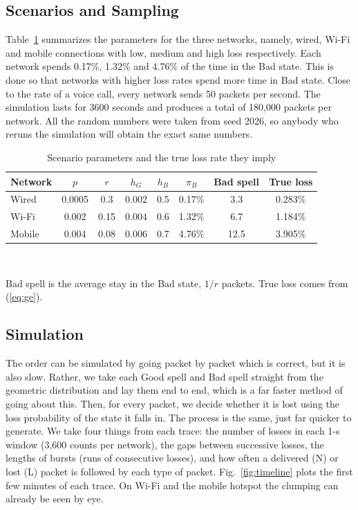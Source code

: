 \documentclass[conference]{IEEEtran}
\begin{document}
\subsection{Scenarios and Sampling}
Table~\ref{tab:params} summarizes the parameters for the three networks, namely, wired, Wi-Fi and mobile connections with low, medium and high loss respectively. Each network spends 0.17\%, 1.32\% and 4.76\% of the time in the Bad state. This is done so that networks with higher loss rates spend more time in Bad state. Close to the rate of a voice call, every network sends 50 packets per second. The simulation lasts for 3600 seconds and produces a total of 180,000 packets per network. All the random numbers were taken from seed 2026, so anybody who reruns the simulation will obtain the exact same numbers.

\begin{table}[!t]
\caption{Scenario parameters and the true loss rate they imply}
\label{tab:params}
\centering
\footnotesize
\setlength{\tabcolsep}{3.2pt}
\begin{tabular}{lccccccc}
\toprule
Network & $p$ & $r$ & $h_G$ & $h_B$ & $\pi_B$ & Bad spell & True loss \\
\midrule
Wired & 0.0005 & 0.3 & 0.002 & 0.5 & 0.17\% & 3.3 & 0.283\% \\
Wi-Fi & 0.002 & 0.15 & 0.004 & 0.6 & 1.32\% & 6.7 & 1.184\% \\
Mobile & 0.004 & 0.08 & 0.006 & 0.7 & 4.76\% & 12.5 & 3.905\% \\
\bottomrule
\end{tabular}
\\[2pt]
\raggedright\scriptsize Bad spell is the average stay in the Bad state, $1/r$ packets. True loss comes from (\ref{eq:ge}).
\end{table}

\subsection{Simulation}
The order can be simulated by going packet by packet which is correct, but it is also slow. Rather, we take each Good spell and Bad spell straight from the geometric distribution and lay them end to end, which is a far faster method of going about this. Then, for every packet, we decide whether it is lost using the loss probability of the state it falls in. The process is the same, just far quicker to generate. We take four things from each trace: the number of losses in each 1-s window (3{,}600 counts per network), the gaps between successive losses, the lengths of bursts (runs of consecutive losses), and how often a delivered (N) or lost (L) packet is followed by each type of packet. Fig.~\ref{fig:timeline} plots the first few minutes of each trace. On Wi-Fi and the mobile hotspot the clumping can already be seen by eye.
\end{document}
